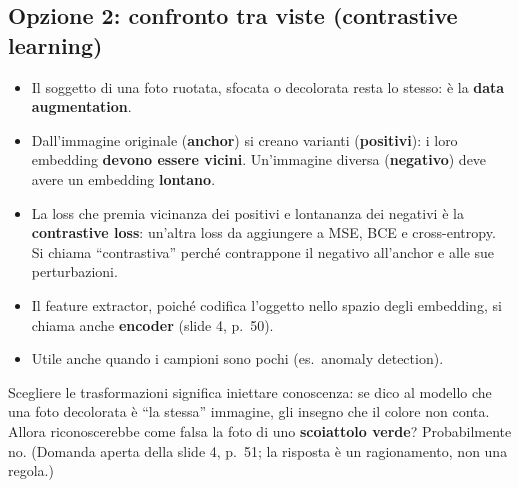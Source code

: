 \subsection{Opzione 2: confronto tra viste (contrastive learning)}
\begin{itemize}
  \item Il soggetto di una foto ruotata, sfocata o decolorata resta lo stesso: è la \textbf{data augmentation}.
  \item Dall'immagine originale (\textbf{anchor}) si creano varianti (\textbf{positivi}): i loro embedding \textbf{devono essere vicini}.
        Un'immagine diversa (\textbf{negativo}) deve avere un embedding \textbf{lontano}.
  \item La loss che premia vicinanza dei positivi e lontananza dei negativi è la \textbf{contrastive loss}: un'altra loss da aggiungere a MSE,
        BCE e cross-entropy. Si chiama ``contrastiva'' perché contrappone il negativo all'anchor e alle sue perturbazioni.
  \item Il feature extractor, poiché codifica l'oggetto nello spazio degli embedding, si chiama anche \textbf{encoder} (slide 4, p.~50).
  \item Utile anche quando i campioni sono pochi (es.\ anomaly detection).
\end{itemize}
\begin{attenzione}
Scegliere le trasformazioni significa iniettare conoscenza: se dico al modello che una foto decolorata è ``la stessa'' immagine, gli insegno
che il colore non conta. Allora riconoscerebbe come falsa la foto di uno \textbf{scoiattolo verde}? Probabilmente no. (Domanda aperta della
slide 4, p.~51; la risposta è un ragionamento, non una regola.)
\end{attenzione}

